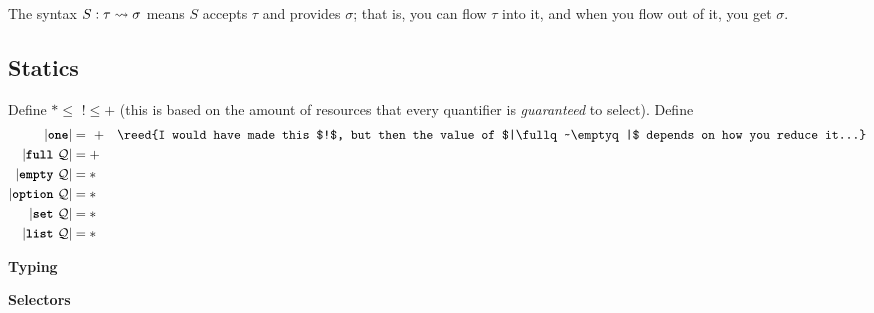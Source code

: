 \documentclass[10pt]{article}
\begin{document}
The syntax $S : \tau \flowsto \sigma$ means $S$ accepts $\tau$ and provides $\sigma$; that is, you can flow $\tau$ into it, and when you flow out of it, you get $\sigma$.

\subsection{Statics}
Define $* \leq \,\, ! \leq +$ (this is based on the amount of resources that every quantifier is \emph{guaranteed} to select).
Define
\begin{align*}
    |\one| &= \,\, + & \text{\reed{I would have made this $!$, but then the value of $|\fullq~\emptyq|$ depends on how you reduce it...}} \\
    |\fullq~\mathcal{Q}| &= + \\
    |\emptyq~\mathcal{Q}| &= * \\
    |\optionq~\mathcal{Q}| &= * \\
    |\setq~\mathcal{Q}| &= * \\
    |\listq~\mathcal{Q}| &= *
\end{align*}


 \textbf{Typing}
\begin{mathpar}




\end{mathpar}


 \textbf{Selectors}
\begin{mathpar}


\end{mathpar}
\end{document}
